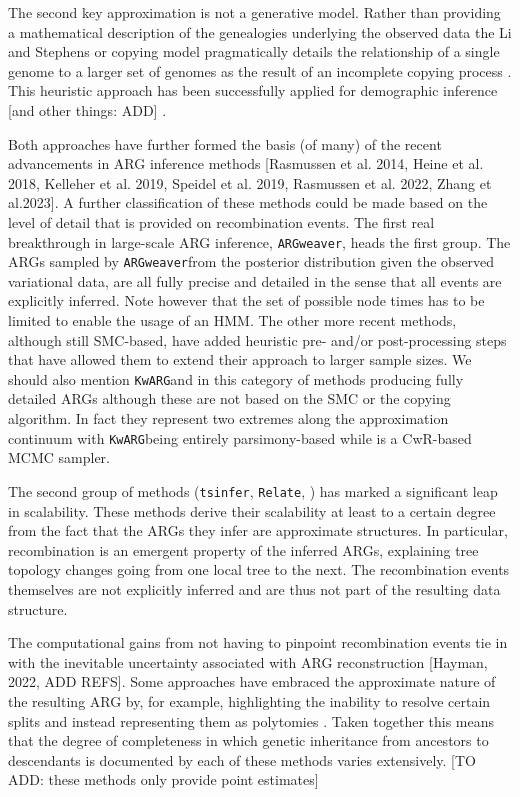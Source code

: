 \documentclass{article}
\newcommand{\tsinfer}[0]{\texttt{tsinfer}}
\newcommand{\kwarg}[0]{\texttt{KwARG}}
\newcommand{\argweaver}[0]{\texttt{ARGweaver}}
\newcommand{\relate}[0]{\texttt{Relate}}
\begin{document}
The second key approximation is not a generative model. Rather than providing 
a mathematical description of the genealogies underlying the observed data 
the Li and Stephens or copying model pragmatically details the relationship 
of a single genome to a larger set of genomes as the result of an 
incomplete copying process \citep{li_2003_modeling}. This heuristic approach 
has been successfully applied for demographic inference [and other things: ADD] 
\citep{sheehan_2013_estimating, steinrucken_2018}.

Both approaches have further formed the basis (of many) of the recent advancements in 
ARG inference methods [Rasmussen et al. 2014, Heine et al. 2018, 
Kelleher et al. 2019, Speidel et al. 2019,
Rasmussen et al. 2022, Zhang et al.2023]. 
A further classification of these methods could be made based on the level of detail 
that is provided on recombination events. The first real breakthrough in large-scale 
ARG inference, \argweaver, heads the first group. 
The ARGs sampled by \argweaver from the posterior distribution 
given the observed variational data, are all fully precise and detailed in the sense 
that all events are explicitly inferred. Note however that the set of possible node times 
has to be limited to enable the usage of an HMM. The other more recent methods, although 
still SMC-based, have added heuristic pre- and/or post-processing steps 
that have allowed them to extend their approach to larger sample sizes. We should also 
mention \kwarg and \arginfer in this category of methods producing fully detailed ARGs 
although these are not based on the SMC or the copying algorithm. In fact they represent 
two extremes along the approximation continuum with \kwarg being entirely 
parsimony-based while \arginfer is a CwR-based MCMC sampler.



The second group of methods (\tsinfer, \relate, \argneedle) has marked a significant  
leap in scalability. These methods derive their scalability at least to a certain 
degree from the fact that the ARGs they infer are approximate structures. In particular, 
recombination is an emergent property of the inferred ARGs, explaining tree topology 
changes going from one local tree to the next. The recombination events themselves 
are not explicitly inferred and are thus not part of the resulting data structure.

The computational gains from not having to pinpoint recombination events tie in 
with the inevitable uncertainty associated with ARG reconstruction [Hayman, 2022, ADD REFS]. 
Some approaches have embraced the approximate nature of the resulting ARG by, for 
example, highlighting the inability to resolve certain splits and instead representing 
them as polytomies \citep{kelleher_2019_inferring}. Taken together this means that the 
degree of completeness in which genetic inheritance from ancestors to descendants is documented 
by each of these methods varies extensively.
[TO ADD: these methods only provide point estimates]
\end{document}
